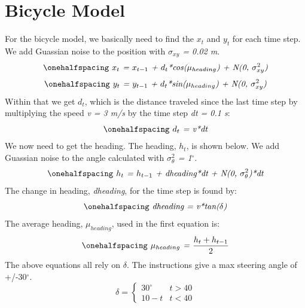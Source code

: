 \documentclass[12pt]{article}
\begin{document}


\newpage
\singlespacing
{}
\section{Bicycle Model}
\setlength{\parindent}{1cm}

For the bicycle model, we basically need to find the \textit{$x_t$} and \textit{$y_t$} for each time step. We add Guassian noise to the position with \textit{$\sigma_{xy}$ = 0.02 m}.
\begin{equation}
\onehalfspacing
\centering
\emph{ $x_t$ = $x_{t-1}$ + $d_t$*cos($\mu_{heading}$) + N(0, $\sigma_{xy}^2$)}
\end{equation}
\begin{equation}
\onehalfspacing
\centering
\emph{ $y_t$ = $y_{t-1}$ + $d_t$*sin($\mu_{heading}$) + N(0, $\sigma_{xy}^2$)}
\end{equation}
 Within that we get \textit{$d_t$}, which is the distance traveled since the last time step by multiplying the speed \textit{v = 3 m/s} by the time step  \textit{dt = 0.1 s}: 
\begin{equation}
\onehalfspacing
\centering
\emph{ $d_t$ =  v*dt}
\end{equation}
We now need to get the heading. The heading, \textit{$h_t$}, is shown below. We add Guassian noise to the angle calculated with \textit{$\sigma_\theta^2$ = 1$^\circ$}.
\begin{equation}
\onehalfspacing
\centering
\emph{ $h_t$ = $h_{t-1}$ + dheading*dt + N(0, $\sigma_\theta^2$)*dt}
\end{equation}
The change in heading, \textit{dheading}, for the time step is found by:
\begin{equation}
\onehalfspacing
\centering
\emph{ dheading = v*tan($\delta$)}
\end{equation}
The average heading, \textit{$\mu_{heading}$}, used in the first equation is: 
\begin{equation}
\onehalfspacing
\centering
\emph{ $\mu_{heading}$ = $\frac{h_t + h_{t-1}}{2}$}
\end{equation}
The above equations all rely on \textit{$\delta$}. The instructions give a max steering angle of +/-30$^\circ$.
\[ 
      \delta = 
      \begin{cases} 
      30^\circ & t > 40\\
      10 - t & t < 40
   \end{cases}
\]
\end{document}
